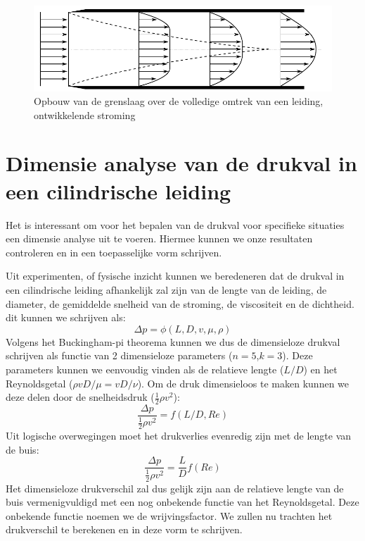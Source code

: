 \begin{figure}[htb]
	\centering
	\includegraphics{fig/stroming_in_leidingen/Ontwikkelende_stroming}
	\caption{Opbouw van de grenslaag over de volledige omtrek van een leiding, ontwikkelende stroming}
	\label{fig:Ontwikkelende_stroming}
\end{figure}

	\section{Dimensie analyse van de drukval in een cilindrische leiding}
	\label{sec:Dimensie analyse van de drukval in een cilindrische leiding}
Het is interessant om voor het bepalen van de drukval voor specifieke situaties een dimensie analyse uit te voeren. Hiermee kunnen we onze resultaten controleren en in een toepasselijke vorm schrijven.

Uit experimenten, of fysische inzicht kunnen we beredeneren dat de drukval in een cilindrische leiding afhankelijk zal zijn van de lengte van de leiding, de diameter, de gemiddelde snelheid van de stroming, de viscositeit en de dichtheid.
dit kunnen we schrijven als:
\begin{equation}
	\Delta p = \phi(L,D,v,\mu,\rho)
\end{equation}
Volgens het Buckingham-pi theorema kunnen we dus de dimensieloze drukval schrijven als functie van 2 dimensieloze parameters ($n=5$,$k=3$). Deze parameters kunnen we eenvoudig vinden als de relatieve lengte ($L/D$) en het Reynoldsgetal ($\rho v D/\mu = v D/\nu$). Om de druk dimensieloos te maken kunnen we deze delen door de snelheidsdruk ($\frac{1}{2} \rho v^2$):
\begin{equation}
	\frac{\Delta p}{\frac{1}{2}\rho v^2} = f(L/D,Re)
\end{equation}
Uit logische overwegingen moet het drukverlies evenredig zijn met de lengte van de buis:
\begin{equation}
	\frac{\Delta p}{\frac{1}{2}\rho v^2} = \frac{L}{D} f(Re)
	\label{eqn:dimensie analyse drukval laminair}
\end{equation}
Het dimensieloze drukverschil zal dus gelijk zijn aan de relatieve lengte van de buis vermenigvuldigd met een nog onbekende functie van het Reynoldsgetal. Deze onbekende functie noemen we de wrijvingsfactor. We zullen nu trachten het drukverschil te berekenen en in deze vorm te schrijven.
	

